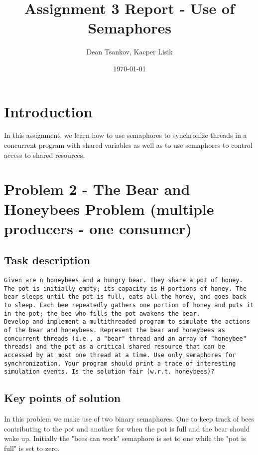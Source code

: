 \documentclass[a4paper,11pt]{article}
\begin{document}
\title{
    \textbf{Assignment 3 Report - Use of Semaphores}
}
\author{Dean Tsankov, Kacper Lisik}
\date{\today}

\maketitle

\section*{Introduction}

In this assignment, we learn how to use semaphores to synchronize threads in a concurrent program with shared variables as well as to use semaphores to control access to shared resources.

\section*{Problem 2 - The Bear and Honeybees Problem (multiple producers - one consumer)}

\subsection*{Task description}

\begin{verbatim}
Given are n honeybees and a hungry bear. They share a pot of honey. The pot is initially empty; its capacity is H portions of honey. The bear sleeps until the pot is full, eats all the honey, and goes back to sleep. Each bee repeatedly gathers one portion of honey and puts it in the pot; the bee who fills the pot awakens the bear.
Develop and implement a multithreaded program to simulate the actions of the bear and honeybees. Represent the bear and honeybees as concurrent threads (i.e., a "bear" thread and an array of "honeybee" threads) and the pot as a critical shared resource that can be accessed by at most one thread at a time. Use only semaphores for synchronization. Your program should print a trace of interesting simulation events. Is the solution fair (w.r.t. honeybees)?
\end{verbatim}


\subsection*{Key points of solution}
In this problem we make use of two binary semaphores. One to keep track of bees contributing to the pot and another for when the pot is full and the bear should wake up. Initially the "bees can work" semaphore is set to one while the "pot is full" is set to zero.
\end{document}
